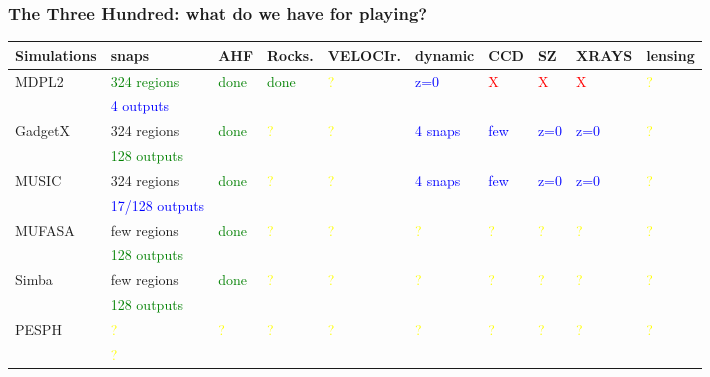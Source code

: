 \documentclass[aspectratio=43]{beamer}
\begin{document}
\begin{frame}
  \frametitle{The Three Hundred: what do we have for playing?}
  \begin{table}
    \fontsize{6}{6}\selectfont
    \begin{tabular}{llllllllll}
      \hline
      Simulations & snaps & AHF & Rocks. &VELOCIr. & dynamic & CCD & SZ & XRAYS & lensing\\
      \hline
      MDPL2 & \textcolor{green}{324 regions} & \textcolor{green}{done} & \textcolor{green}{done} & \textcolor{yellow}{?} & \textcolor{blue}{z=0} & \textcolor{red}{X} & \textcolor{red}{X} & \textcolor{red}{X} & \textcolor{yellow}{?} \\
      &\textcolor{blue}{4 outputs}&&&&&&&&\\
      \hdashline
      GadgetX & 324 regions & \textcolor{green}{done} & \textcolor{yellow}{?} & \textcolor{yellow}{?} & \textcolor{blue}{4 snaps} & \textcolor{blue}{few} & \textcolor{blue}{z=0} & \textcolor{blue}{z=0} & \textcolor{yellow}{?}\\
      &\textcolor{green}{128 outputs}&&&&&&&&\\
      MUSIC & 324 regions& \textcolor{green}{done} & \textcolor{yellow}{?} & \textcolor{yellow}{?} & \textcolor{blue}{4 snaps} & \textcolor{blue}{few} & \textcolor{blue}{z=0} & \textcolor{blue}{z=0} & \textcolor{yellow}{?}\\
      &\textcolor{blue}{17/128 outputs}&&&&&&&&\\
      MUFASA & few regions & \textcolor{green}{done} & \textcolor{yellow}{?} & \textcolor{yellow}{?} & \textcolor{yellow}{?} & \textcolor{yellow}{?} & \textcolor{yellow}{?} & \textcolor{yellow}{?} & \textcolor{yellow}{?}\\
      &\textcolor{green}{128 outputs}&&&&&&&&\\
      Simba & few regions& \textcolor{green}{done} & \textcolor{yellow}{?} & \textcolor{yellow}{?} & \textcolor{yellow}{?} & \textcolor{yellow}{?} & \textcolor{yellow}{?} & \textcolor{yellow}{?} & \textcolor{yellow}{?}\\
      &\textcolor{green}{128 outputs}&&&&&&&&\\
      PESPH & \textcolor{yellow}{?} & \textcolor{yellow}{?} & \textcolor{yellow}{?} & \textcolor{yellow}{?} & \textcolor{yellow}{?} & \textcolor{yellow}{?} & \textcolor{yellow}{?} & \textcolor{yellow}{?} & \textcolor{yellow}{?}\\
      &\textcolor{yellow}{?}&&&&&&&&\\

\end{tabular}
\end{table}
\end{frame}
\end{document}
